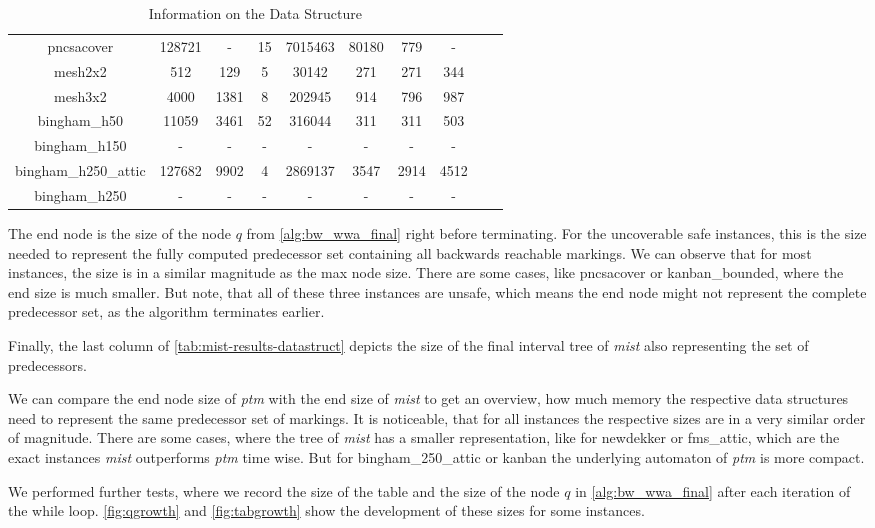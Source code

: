 \begin{table}[H]
{\begin{tabular}{c c c c c c c c c c}
pncsacover & 128721 & - & 15 & 7015463 & 80180 & 779 & - \\
mesh2x2 & 512 & 129 & 5 & 30142 & 271 & 271 & 344 \\
mesh3x2 & 4000 & 1381 & 8 & 202945 & 914 & 796 & 987 \\
bingham\_h50 & 11059 & 3461 & 52 & 316044 & 311 & 311 & 503 \\
bingham\_h150 & - & - & - & - & - & - & - \\
bingham\_h250\_attic & 127682 & 9902 & 4 & 2869137 & 3547 & 2914 & 4512 \\
bingham\_h250 & - & - & - & - & - & - & - \\
        \bottomrule
\end{tabular}%
}
\caption{Information on the Data Structure}
\label{tab:mist-results-datastruct}
\end{table}

The end node is the size of the node $q$ from \autoref{alg:bw_wwa_final} right before terminating. For the uncoverable safe instances, this is the size needed to represent the fully computed predecessor set containing all backwards reachable markings. We can observe that for most instances, the size is in a similar magnitude as the max node size. There are some cases, like pncsacover or kanban\_bounded, where the end size is much smaller. But note, that all of these three instances are unsafe, which means the end node might not represent the complete predecessor set, as the algorithm terminates earlier.

Finally, the last column of \autoref{tab:mist-results-datastruct} depicts the size of the final interval tree of \textit{mist} also representing the set of predecessors.

We can compare the end node size of \textit{ptm} with the end size of  \textit{mist} to get an overview, how much memory the respective data structures need to represent the same predecessor set of markings. It is noticeable, that for all instances the respective sizes are in a very similar order of magnitude. There are some cases, where the tree of \textit{mist} has a smaller representation, like for newdekker or fms\_attic, which are the exact instances \textit{mist} outperforms \textit{ptm} time wise. But for bingham\_250\_attic or kanban the underlying automaton of \textit{ptm} is more compact. 

\bigbreak 

We performed further tests, where we record the size of the table and the size of the node $q$ in \autoref{alg:bw_wwa_final} after each iteration of the while loop. 
\autoref{fig:qgrowth} and \autoref{fig:tabgrowth} show the development of these sizes for some instances.


